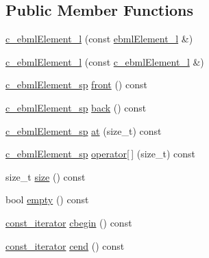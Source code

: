 \subsection*{Public Member Functions}
\begin{DoxyCompactItemize}
\item 
\mbox{\hyperlink{classebml_1_1c__ebmlElement__l_afad39184d6e43871e4c9c8a14e0fd969}{c\+\_\+ebml\+Element\+\_\+l}} (const \mbox{\hyperlink{namespaceebml_a1ddadd26791f273d851882653b9caf70}{ebml\+Element\+\_\+l}} \&)
\item 
\mbox{\hyperlink{classebml_1_1c__ebmlElement__l_a9d5550deb8015eafbd81eaee562eadbe}{c\+\_\+ebml\+Element\+\_\+l}} (const \mbox{\hyperlink{classebml_1_1c__ebmlElement__l}{c\+\_\+ebml\+Element\+\_\+l}} \&)
\item 
\mbox{\hyperlink{namespaceebml_a2deef4e8071531b32e3533f1bf978917}{c\+\_\+ebml\+Element\+\_\+sp}} \mbox{\hyperlink{classebml_1_1c__ebmlElement__l_ae21b42b7599179c218be4c05ea0fb07c}{front}} () const
\item 
\mbox{\hyperlink{namespaceebml_a2deef4e8071531b32e3533f1bf978917}{c\+\_\+ebml\+Element\+\_\+sp}} \mbox{\hyperlink{classebml_1_1c__ebmlElement__l_a9a3f7be3e7bb6d6c3005da1c3140247e}{back}} () const
\item 
\mbox{\hyperlink{namespaceebml_a2deef4e8071531b32e3533f1bf978917}{c\+\_\+ebml\+Element\+\_\+sp}} \mbox{\hyperlink{classebml_1_1c__ebmlElement__l_a81866f8123d15fb41d7f8e8d4e4cca41}{at}} (size\+\_\+t) const
\item 
\mbox{\hyperlink{namespaceebml_a2deef4e8071531b32e3533f1bf978917}{c\+\_\+ebml\+Element\+\_\+sp}} \mbox{\hyperlink{classebml_1_1c__ebmlElement__l_a96efd97da3095d4041f055415ab9ae6b}{operator\mbox{[}$\,$\mbox{]}}} (size\+\_\+t) const
\item 
size\+\_\+t \mbox{\hyperlink{classebml_1_1c__ebmlElement__l_adc228d5daa606faf08cb29feedee3d33}{size}} () const
\item 
bool \mbox{\hyperlink{classebml_1_1c__ebmlElement__l_a832048afabdeb9dfa373f3c8ed7c595b}{empty}} () const
\item 
\mbox{\hyperlink{classebml_1_1c__ebmlElement__l_1_1const__iterator}{const\+\_\+iterator}} \mbox{\hyperlink{classebml_1_1c__ebmlElement__l_ae6f0e1b17374fbaee1ffdac656a46496}{cbegin}} () const
\item 
\mbox{\hyperlink{classebml_1_1c__ebmlElement__l_1_1const__iterator}{const\+\_\+iterator}} \mbox{\hyperlink{classebml_1_1c__ebmlElement__l_a8bc0ed15b406c1a1144ad2fb55a195bc}{cend}} () const
\end{DoxyCompactItemize}


